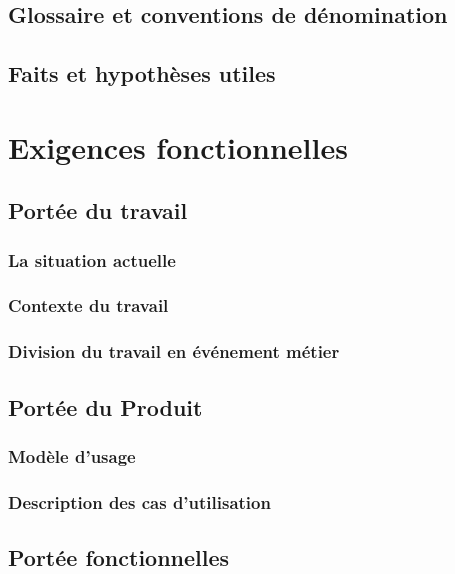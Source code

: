 \documentclass[a4paper, 12pt, french]{report}
\begin{document}
		\section{Glossaire et conventions de dénomination}
			

		\section{Faits et hypothèses utiles}
			

	\chapter{Exigences fonctionnelles}
		\section{Portée du travail}
			\subsection{La situation actuelle}
				

			\subsection{Contexte du travail}
				
				
			\subsection{Division du travail en événement métier}
				
		\section{Portée du Produit}
			\subsection{Modèle d'usage}
			\subsection{Description des cas d'utilisation}

		\section{Portée fonctionnelles}
\end{document}
